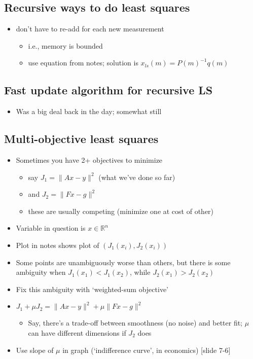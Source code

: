 \documentclass[10pt,letterpaper]{article}
\begin{document}
\subsection{Recursive ways to do least squares}
\label{sec-5_6}

\begin{itemize}
\item don't have to re-add for each new measurement

\begin{itemize}
\item i.e., memory is bounded
\item use equation from notes; solution is $x _{ls} (m) = P(m) ^{-1} q(m)$
\end{itemize}

\end{itemize}
\subsection{Fast update algorithm for recursive LS}
\label{sec-5_7}

\begin{itemize}
\item Was a big deal back in the day; somewhat still
\end{itemize}
\subsection{Multi-objective least squares}
\label{sec-5_8}

\begin{itemize}
\item Sometimes you have 2+ objectives to minimize

\begin{itemize}
\item say $J_1 = \| Ax-y\| ^{2}$ (what we've done so far)
\item and $J_2 = \| Fx-g\| ^{2}$
\item these are usually competing (minimize one at cost of other)
\end{itemize}

\item Variable in question is $x \in \mathbb{R}^{n}$
\item Plot in notes shows plot of $(J_1(x_i), J_2(x_i))$
\item Some points are unambiguously worse than others, but there is some ambiguity when $J_1(x_1) < J_1(x_2)$, while $J_2(x_1) > J_2(x_2)$
\item Fix this ambiguity with `weighted-sum objective'
\item $J_1 + \mu J_2 = \| Ax-y\| ^{2} + \mu \| Fx-g\| ^{2}$

\begin{itemize}
\item Say, there's a trade-off between smoothness (no noise) and better fit; $\mu$ can have different dimensions if $J_2$ does
\end{itemize}

\item Use slope of $\mu$ in graph (`indifference curve', in economics) [slide 7-6]
\end{itemize}
\end{document}
